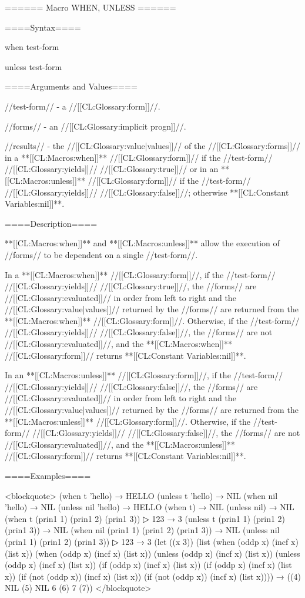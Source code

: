 ====== Macro WHEN, UNLESS ======

====Syntax====

\DefmacWithValues when {test-form } {}

\DefmacWithValues unless {test-form } {}

====Arguments and Values====

//test-form// - a //[[CL:Glossary:form]]//.

//forms// - an //[[CL:Glossary:implicit progn]]//.

//results// - the //[[CL:Glossary:value|values]]// of the //[[CL:Glossary:forms]]// in a **[[CL:Macros:when]]** //[[CL:Glossary:form]]// if the //test-form// //[[CL:Glossary:yields]]// //[[CL:Glossary:true]]// or in an **[[CL:Macros:unless]]** //[[CL:Glossary:form]]// if the //test-form// //[[CL:Glossary:yields]]// //[[CL:Glossary:false]]//; otherwise **[[CL:Constant Variables:nil]]**.

====Description====

**[[CL:Macros:when]]** and **[[CL:Macros:unless]]** allow the execution of //forms// to be dependent on a single //test-form//.

In a **[[CL:Macros:when]]** //[[CL:Glossary:form]]//, if the //test-form// //[[CL:Glossary:yields]]// //[[CL:Glossary:true]]//, the //forms// are //[[CL:Glossary:evaluated]]// in order from left to right and the //[[CL:Glossary:value|values]]// returned by the //forms// are returned from the **[[CL:Macros:when]]** //[[CL:Glossary:form]]//. Otherwise, if the //test-form// //[[CL:Glossary:yields]]// //[[CL:Glossary:false]]//, the //forms// are not //[[CL:Glossary:evaluated]]//, and the **[[CL:Macros:when]]** //[[CL:Glossary:form]]// returns **[[CL:Constant Variables:nil]]**.

In an **[[CL:Macros:unless]]** //[[CL:Glossary:form]]//, if the //test-form// //[[CL:Glossary:yields]]// //[[CL:Glossary:false]]//, the //forms// are //[[CL:Glossary:evaluated]]// in order from left to right and the //[[CL:Glossary:value|values]]// returned by the //forms// are returned from the **[[CL:Macros:unless]]** //[[CL:Glossary:form]]//. Otherwise, if the //test-form// //[[CL:Glossary:yields]]// //[[CL:Glossary:false]]//, the //forms// are not //[[CL:Glossary:evaluated]]//, and the **[[CL:Macros:unless]]** //[[CL:Glossary:form]]// returns **[[CL:Constant Variables:nil]]**.

====Examples====

<blockquote> (when t 'hello) → HELLO (unless t 'hello) → NIL (when nil 'hello) → NIL (unless nil 'hello) → HELLO (when t) → NIL (unless nil) → NIL (when t (prin1 1) (prin1 2) (prin1 3))
▷ 123 → 3 (unless t (prin1 1) (prin1 2) (prin1 3)) → NIL (when nil (prin1 1) (prin1 2) (prin1 3)) → NIL (unless nil (prin1 1) (prin1 2) (prin1 3))
▷ 123 → 3 (let ((x 3)) (list (when (oddp x) (incf x) (list x)) (when (oddp x) (incf x) (list x)) (unless (oddp x) (incf x) (list x)) (unless (oddp x) (incf x) (list x)) (if (oddp x) (incf x) (list x)) (if (oddp x) (incf x) (list x)) (if (not (oddp x)) (incf x) (list x)) (if (not (oddp x)) (incf x) (list x)))) → ((4) NIL (5) NIL 6 (6) 7 (7)) </blockquote>

